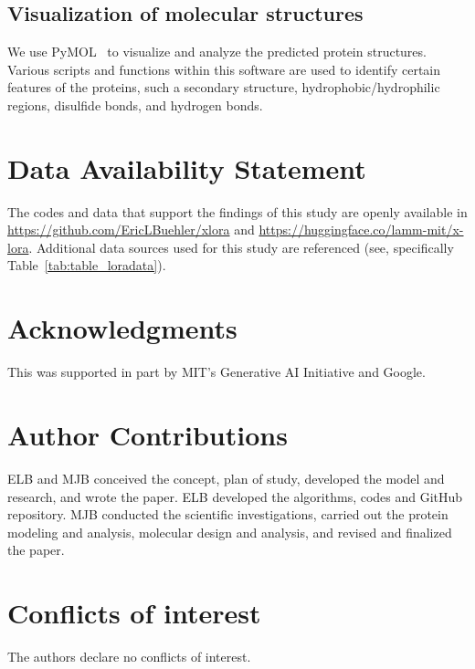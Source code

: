 \documentclass{article}
\begin{document}
\subsection{Visualization of molecular structures}

We use PyMOL~\cite{Schrodinger2015The1.8} to visualize and analyze the predicted protein structures. Various scripts and functions within this software are used to identify certain features of the proteins, such a secondary structure, hydrophobic/hydrophilic regions, disulfide bonds, and hydrogen bonds. 


\section*{Data Availability Statement}
The codes and data that support the findings of this study are openly available in \url{https://github.com/EricLBuehler/xlora} and \url{https://huggingface.co/lamm-mit/x-lora}. Additional data sources used for this study are referenced (see, specifically Table~\ref{tab:table_loradata}). 

\section*{Acknowledgments}
This was supported in part by MIT's Generative AI Initiative and Google. 
 
\section*{Author Contributions}
ELB and MJB conceived the concept, plan of study, developed the model and research, and wrote the paper. ELB developed the algorithms, codes and GitHub repository. MJB conducted the scientific investigations, carried out the protein modeling and analysis, molecular design and analysis, and revised and finalized the paper.  

\section*{Conflicts of interest}
The authors declare no conflicts of interest.

 
  
\end{document}

